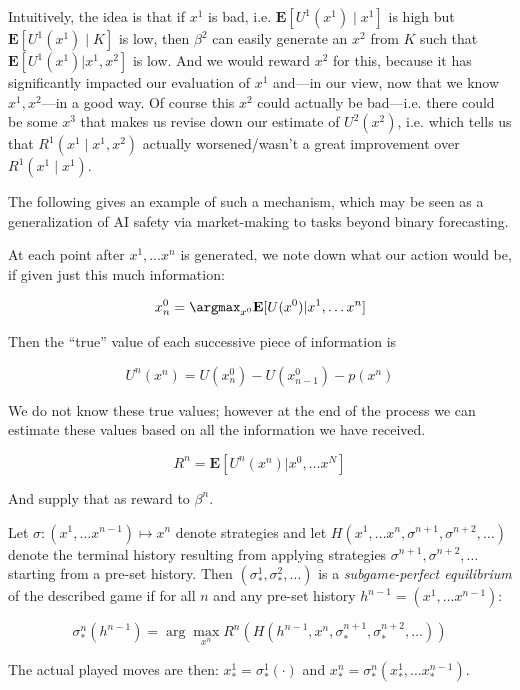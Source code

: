 Intuitively, the idea is that if $x^1$ is bad, i.e. $\mathbf{E}[U^1(x^1)\mid x^1]$ is high but $\mathbf{E}[U^1(x^1)\mid K]$ is low, then $\beta^2$ can easily generate an $x^2$ from $K$ such that $\mathbf{E}[U^1(x^1)|x^1,x^2]$ is low. And we would reward $x^2$ for this, because it has significantly impacted our evaluation of $x^1$ and---in our view, now that we know $x^1,x^2$---in a good way. Of course this $x^2$ could actually be bad---i.e. there could be some $x^3$ that makes us revise down our estimate of $U^2(x^2)$, i.e. which tells us that $R^1(x^1\mid x^1,x^2)$ actually worsened/wasn't a great improvement over $R^1(x^1\mid x^1)$.

The following gives an example of such a mechanism, which may be seen as a generalization of AI safety via market-making to tasks beyond binary forecasting.

\begin{definition}
At each point after $x^1,\dots x^n$ is generated, we note down what our action would be, if given just this much information:

$$x^0_n=\argmax_{x^0}\mathbf{E}[U(x^0)|x^1,\dots x^n]$$

Then the ``true'' value of each successive piece of information is

$$U^n(x^n)=U(x^0_n)-U(x^0_{n-1}) - p(x^n)$$

We do not know these true values; however at the end of the process we can estimate these values based on all the information we have received.

$$R^n=\mathbf{E}[U^n(x^n)|x^0,\dots x^N]$$

And supply that as reward to $\beta^n$.
\label{infonomy:def:mvm}
\end{definition}



\begin{definition}[Equilibrium]
Let $\sigma:(x^1,\dots x^{n-1})\mapsto x^n$ denote strategies and let $H(x^1,\dots x^n,\sigma^{n+1},\sigma^{n+2},\dots)$ denote the terminal history resulting from applying strategies $\sigma^{n+1},\sigma^{n+2},\dots$ starting from a pre-set history. Then $(\sigma^1_*,\sigma^2_*,\dots)$ is a \emph{subgame-perfect equilibrium} of the described game if for all $n$ and any pre-set history $h^{n-1}=(x^1,\dots x^{n-1})$:

$$\sigma^n_*(h^{n-1}) = \arg\max_{x^n}R^n(H(h^{n-1},x^n,\sigma^{n+1}_*,\sigma^{n+2}_*,\dots))$$

The actual played moves are then: $x^1_*=\sigma^1_*(\cdot)$ and $x^n_*=\sigma^n_*(x^1_*,\dots x^{n-1}_*)$.
\label{infonomy:def:eq}
\end{definition}

